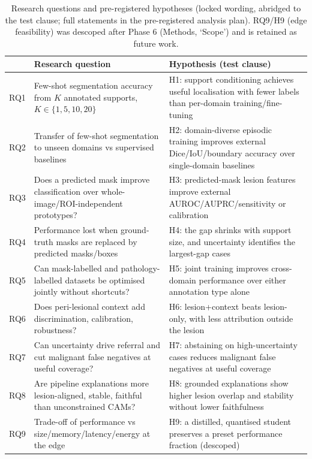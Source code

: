 \documentclass[jimh,article,submit,moreauthors,pdftex]{Definitions/tsp}
\begin{document}
\begin{table}[!ht]
\centering\scriptsize
\setlength{\tabcolsep}{4pt}
\caption{Research questions and pre-registered hypotheses (locked wording,
abridged to the test clause; full statements in the pre-registered analysis
plan). RQ9/H9 (edge feasibility) was descoped after Phase 6 (Methods,
`Scope') and is retained as future work.}
\label{tab:rqh}
\begin{tabular}{@{}p{9mm}p{38mm}p{62mm}@{}}
\toprule
 & \textbf{Research question} & \textbf{Hypothesis (test clause)} \\
\midrule
RQ1 & Few-shot segmentation accuracy from $K$ annotated supports, $K{\in}\{1,5,10,20\}$ &
H1: support conditioning achieves useful localisation with fewer labels than per-domain training/fine-tuning \\
RQ2 & Transfer of few-shot segmentation to unseen domains vs supervised baselines &
H2: domain-diverse episodic training improves external Dice/IoU/boundary accuracy over single-domain baselines \\
RQ3 & Does a predicted mask improve classification over whole-image/ROI-independent prototypes? &
H3: predicted-mask lesion features improve external AUROC/AUPRC/sensitivity or calibration \\
RQ4 & Performance lost when ground-truth masks are replaced by predicted masks/boxes &
H4: the gap shrinks with support size, and uncertainty identifies the largest-gap cases \\
RQ5 & Can mask-labelled and pathology-labelled datasets be optimised jointly without shortcuts? &
H5: joint training improves cross-domain performance over either annotation type alone \\
RQ6 & Does peri-lesional context add discrimination, calibration, robustness? &
H6: lesion+context beats lesion-only, with less attribution outside the lesion \\
RQ7 & Can uncertainty drive referral and cut malignant false negatives at useful coverage? &
H7: abstaining on high-uncertainty cases reduces malignant false negatives at useful coverage \\
RQ8 & Are pipeline explanations more lesion-aligned, stable, faithful than unconstrained CAMs? &
H8: grounded explanations show higher lesion overlap and stability without lower faithfulness \\
RQ9 & Trade-off of performance vs size/memory/latency/energy at the edge &
H9: a distilled, quantised student preserves a preset performance fraction (descoped) \\
\bottomrule
\end{tabular}
\end{table}
\end{document}
